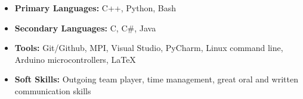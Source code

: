 \documentclass{article}
\begin{document}
\begin{itemize}
    \item \textbf{Primary Languages:} C++, Python, Bash
    \item \textbf{Secondary Languages:} C, C\#, Java
    \item \textbf{Tools:} Git/Github, MPI, Visual Studio, PyCharm, Linux command line, Arduino microcontrollers, \LaTeX
    \item \textbf{Soft Skills:}  Outgoing team player, time management, great oral and written communication skills
\end{itemize}



\end{document}
